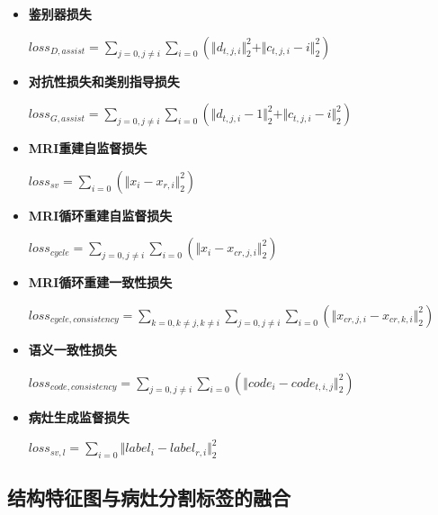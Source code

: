 \documentclass[letterpaper]{article} %
\begin{document}
\begin{itemize}
	\item \textbf{鉴别器损失}
	\begin{center}
		$loss_{D,assist}=\sum\limits_{j=0,j\neq i}\sum\limits_{i=0}(\Vert{d_{t,j,i}}\Vert_{2}^{2}+\Vert{c_{t,j,i}-i}\Vert_{2}^{2})$
	\end{center}
	
	\item \textbf{对抗性损失和类别指导损失}
	\begin{center}
		$loss_{G,assist}=\sum\limits_{j=0,j\neq i}\sum\limits_{i=0}(\Vert{d_{t,j,i}-1}\Vert_{2}^{2}+\Vert{c_{t,j,i}-i}\Vert_{2}^{2})$
	\end{center}
	
	\item \textbf{MRI重建自监督损失}
	\begin{center}
		$loss_{sv}=\sum\limits_{i=0}(\Vert{x_i-x_{r,i}}\Vert_{2}^{2})$
	\end{center}
	
	\item \textbf{MRI循环重建自监督损失}
	
	\begin{center}
		$loss_{cycle}=\sum\limits_{j=0,j\neq i}\sum\limits_{i=0}(\Vert{x_i-x_{cr,j,i}}\Vert_{2}^{2})$
	\end{center}
	
	\item \textbf{MRI循环重建一致性损失}
	\begin{center}
		$loss_{cycle,consistency}=\sum\limits_{k=0,k\neq j,k\neq i}\sum\limits_{j=0,j\neq i}\sum\limits_{i=0}(\Vert{x_{cr,j,i}-x_{cr,k,i}}\Vert_{2}^{2})$
	\end{center}
	
	\item \textbf{语义一致性损失}
	\begin{center}
		$loss_{code,consistency}=\sum\limits_{j=0,j\neq i}\sum\limits_{i=0}(\Vert{code_i-code_{t,i,j}}\Vert_{2}^{2})$
	\end{center}
	
	\item \textbf{病灶生成监督损失}
	\begin{center}
		$loss_{sv,l}=\sum\limits_{i=0}\Vert{label_i-label_{r,i}}\Vert_{2}^{2}$
	\end{center}
	
\end{itemize}

\subsection{结构特征图与病灶分割标签的融合}
\end{document}
